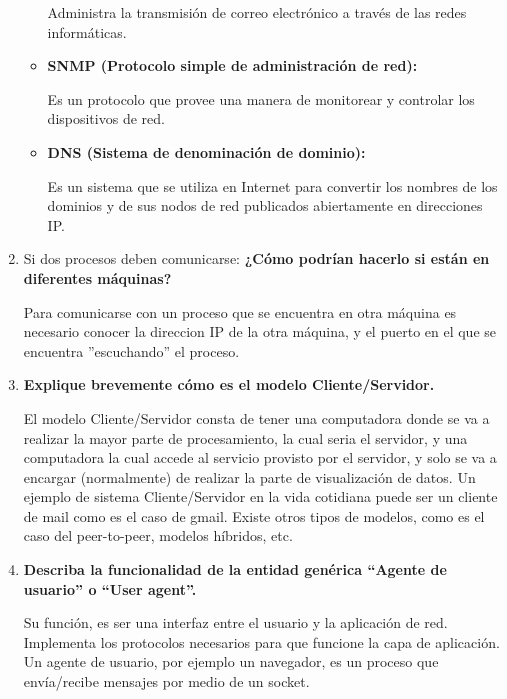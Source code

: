 \documentclass[a4paper,10pt]{article}
\begin{document}
\begin{enumerate}
\begin{itemize}
            Administra la transmisión de correo electrónico a través de las redes informáticas.
            
            \item \textbf{SNMP (Protocolo simple de administración de red):}
            
            Es un protocolo que provee una manera de monitorear y controlar los dispositivos de red.
            
            \item \textbf{DNS (Sistema de denominación de dominio):}
            
            Es un sistema que se utiliza en Internet para convertir los nombres de los dominios y de sus nodos de red publicados abiertamente en direcciones IP.
            
        \end{itemize}
        
    \item Si dos procesos deben comunicarse:
    \textbf{¿Cómo podrían hacerlo si están en diferentes máquinas?}
    
    Para comunicarse con un proceso que se encuentra en otra máquina es necesario conocer la direccion IP de la otra máquina, y el puerto en el que se encuentra ”escuchando” el proceso.
    
    \item \textbf{Explique brevemente cómo es el modelo Cliente/Servidor.}
    
    El modelo Cliente/Servidor consta de tener una computadora donde se va a realizar la mayor parte de procesamiento, la cual seria el servidor, y una computadora la cual accede al servicio provisto por el servidor, y solo se va a encargar (normalmente) de realizar la parte de visualización de datos. Un ejemplo de sistema Cliente/Servidor en la vida cotidiana puede ser un cliente de mail como es el caso de gmail. Existe otros tipos de modelos, como es el caso del peer-to-peer, modelos híbridos, etc.
    
    \item \textbf{Describa la funcionalidad de la entidad genérica “Agente de usuario” o “User agent”.}
    
    Su función, es ser una interfaz entre el usuario y la aplicación de red. Implementa los protocolos necesarios para que funcione la capa de aplicación. Un agente de usuario, por ejemplo un navegador, es un proceso que envía/recibe mensajes por medio de un socket.
        
\end{enumerate}
\end{document}
